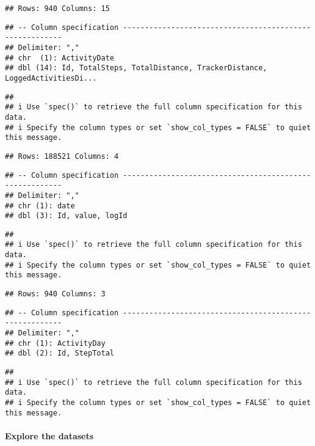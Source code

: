 \documentclass[
]{article}
\begin{document}
\begin{verbatim}
## Rows: 940 Columns: 15
\end{verbatim}

\begin{verbatim}
## -- Column specification --------------------------------------------------------
## Delimiter: ","
## chr  (1): ActivityDate
## dbl (14): Id, TotalSteps, TotalDistance, TrackerDistance, LoggedActivitiesDi...
\end{verbatim}

\begin{verbatim}
## 
## i Use `spec()` to retrieve the full column specification for this data.
## i Specify the column types or set `show_col_types = FALSE` to quiet this message.
\end{verbatim}

\begin{verbatim}
## Rows: 188521 Columns: 4
\end{verbatim}

\begin{verbatim}
## -- Column specification --------------------------------------------------------
## Delimiter: ","
## chr (1): date
## dbl (3): Id, value, logId
\end{verbatim}

\begin{verbatim}
## 
## i Use `spec()` to retrieve the full column specification for this data.
## i Specify the column types or set `show_col_types = FALSE` to quiet this message.
\end{verbatim}

\begin{verbatim}
## Rows: 940 Columns: 3
\end{verbatim}

\begin{verbatim}
## -- Column specification --------------------------------------------------------
## Delimiter: ","
## chr (1): ActivityDay
## dbl (2): Id, StepTotal
\end{verbatim}

\begin{verbatim}
## 
## i Use `spec()` to retrieve the full column specification for this data.
## i Specify the column types or set `show_col_types = FALSE` to quiet this message.
\end{verbatim}

\hypertarget{explore-the-datasets}{%
\paragraph{Explore the datasets}\label{explore-the-datasets}}
\end{document}

